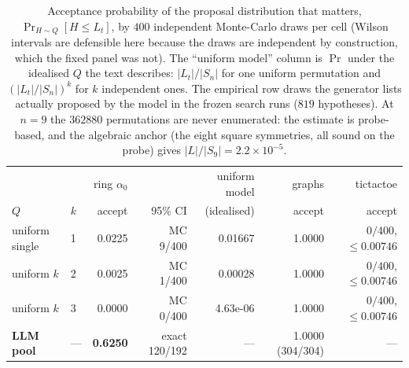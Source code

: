 \documentclass{neurips_2024}
\begin{document}
\begin{table}[t]
\centering
\caption{Acceptance probability of the proposal distribution that matters,
$\Pr_{H\sim Q}[H \le L_t]$, by $400$ independent Monte-Carlo draws per cell (Wilson
intervals are defensible here because the draws are independent by construction, which the
fixed panel was not). The ``uniform model'' column is $\Pr$ under the idealised
$Q$ the text describes: $|L_t|/|S_n|$ for one uniform permutation and $(|L_t|/|S_n|)^k$ for
$k$ independent ones. The empirical row draws the generator lists actually proposed by the
model in the frozen search runs ($819$ hypotheses). At $n=9$ the $362880$ permutations are
never enumerated: the estimate is probe-based, and the algebraic anchor (the eight square
symmetries, all sound on the probe) gives $|L|/|S_9| = 2.2\times10^{-5}$.}
\label{tab:accept}
\small
\begin{tabular}{@{}llrrrrr@{}}
\toprule
& & ring $\alpha_0$ & & uniform model & graphs & tictactoe \\
$Q$ & $k$ & accept & 95\% CI & (idealised) & accept & accept \\
\midrule
uniform single & 1 & 0.0225 & MC 9/400 & 0.01667 & 1.0000 & $0/400$, $\le 0.00746$ \\
uniform $k$ & 2 & 0.0025 & MC 1/400 & 0.00028 & 1.0000 & $0/400$, $\le 0.00746$ \\
uniform $k$ & 3 & 0.0000 & MC 0/400 & 4.63e-06 & 1.0000 & $0/400$, $\le 0.00746$ \\
\textbf{LLM pool} & --- & \textbf{0.6250} & exact 120/192 & --- & 1.0000 (304/304) & --- \\
\bottomrule
\end{tabular}
\end{table}
\end{document}
